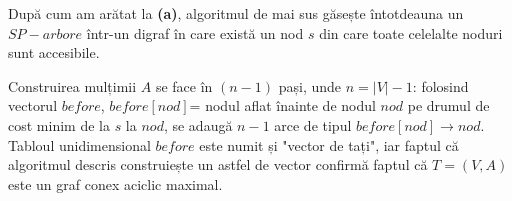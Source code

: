 \documentclass[a4paper,12pt]{article}
\begin{document}
După cum am arătat la \textbf{(a)}, algoritmul de mai sus găsește întotdeauna un $SP-arbore$ într-un digraf în care există un nod $s$ din care toate celelalte noduri sunt accesibile.

Construirea mulțimii $A$ se face în $(n-1)$ pași, unde $n=|V|-1$: folosind vectorul $before$, $before[nod]$= nodul aflat înainte de nodul $nod$ pe drumul de cost minim de la $s$ la $nod$, se adaugă $n-1$ arce de tipul $before[nod] \to nod$. Tabloul unidimensional $before$ este numit și "vector de tați", iar faptul că algoritmul descris construiește un astfel de vector confirmă faptul că $T=(V,A)$ este un graf conex aciclic maximal.
\end{document}

